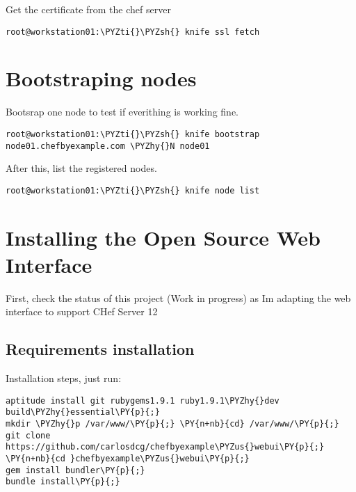 Get the certificate from the chef server

\begin{codelisting}
\label{code:}
\codecaption{}
\begin{Verbatim}[fontsize=\relsize{-2.5},fontseries=b,commandchars=\\\{\}]
root@workstation01:\PYZti{}\PYZsh{} knife ssl fetch
\end{Verbatim}
\end{codelisting}

\section{Bootstraping nodes}

Bootsrap one node to test if everithing is working fine.

\begin{codelisting}
\label{code:}
\codecaption{}
\begin{Verbatim}[fontsize=\relsize{-2.5},fontseries=b,commandchars=\\\{\}]
root@workstation01:\PYZti{}\PYZsh{} knife bootstrap node01.chefbyexample.com \PYZhy{}N node01
\end{Verbatim}
\end{codelisting}

After this, list the registered nodes.

\begin{codelisting}
\label{code:}
\codecaption{}
\begin{Verbatim}[fontsize=\relsize{-2.5},fontseries=b,commandchars=\\\{\}]
root@workstation01:\PYZti{}\PYZsh{} knife node list
\end{Verbatim}
\end{codelisting}

\section{Installing the Open Source Web Interface}

First, check the status of this project (Work in progress) as 
Im adapting the web interface to support CHef Server 12

\subsection{Requirements installation}

Installation steps, just run:
\begin{codelisting}
\label{code:}
\codecaption{}
\begin{Verbatim}[fontsize=\relsize{-2.5},fontseries=b,commandchars=\\\{\}]
aptitude install git rubygems1.9.1 ruby1.9.1\PYZhy{}dev build\PYZhy{}essential\PY{p}{;}
mkdir \PYZhy{}p /var/www/\PY{p}{;} \PY{n+nb}{cd} /var/www/\PY{p}{;} git clone https://github.com/carlosdcg/chefbyexample\PYZus{}webui\PY{p}{;} \PY{n+nb}{cd }chefbyexample\PYZus{}webui\PY{p}{;}
gem install bundler\PY{p}{;}
bundle install\PY{p}{;}
\end{Verbatim}
\end{codelisting}

